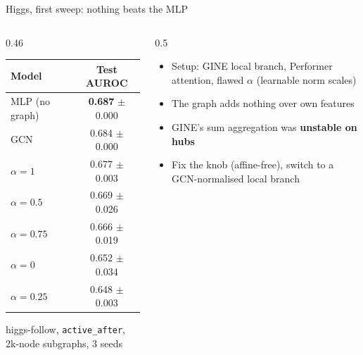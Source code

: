\documentclass[aspectratio=169,10pt]{beamer}
\newcommand{\snote}[1]{{\scriptsize\textcolor{ink!70}{#1}}}
\begin{document}
\begin{frame}{Higgs, first sweep: nothing beats the MLP}
  \begin{columns}[c]
    \begin{column}{0.46\textwidth}
      \centering\small
      \begin{tabular}{@{}lc@{}}
        \toprule
        Model & Test AUROC \\
        \midrule
        MLP (no graph) & \textbf{0.687} $\pm$ 0.000 \\
        GCN & 0.684 $\pm$ 0.000 \\
        $\alpha=1$ & 0.677 $\pm$ 0.003 \\
        $\alpha=0.5$ & 0.669 $\pm$ 0.026 \\
        $\alpha=0.75$ & 0.666 $\pm$ 0.019 \\
        $\alpha=0$ & 0.652 $\pm$ 0.034 \\
        $\alpha=0.25$ & 0.648 $\pm$ 0.003 \\
        \bottomrule
      \end{tabular}

      \snote{higgs-follow, \texttt{active\_after}, 2k-node subgraphs, 3 seeds}
    \end{column}
    \begin{column}{0.5\textwidth}
      \begin{itemize}
        \item Setup: GINE local branch, Performer attention, \alert{flawed $\alpha$} (learnable norm scales)
        \item The graph adds nothing over own features
        \item GINE's sum aggregation was \textbf{unstable on hubs}
        \item[$\Rightarrow$] Fix the knob (affine-free), switch to a GCN-normalised local branch
      \end{itemize}
    \end{column}
  \end{columns}
\end{frame}
\end{document}
